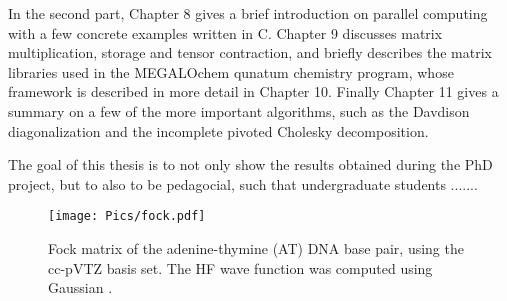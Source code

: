 In the second part, Chapter 8 gives a brief introduction on parallel computing with a few concrete examples written in C. Chapter 9 discusses matrix multiplication, storage and tensor contraction, and briefly describes the matrix libraries used in the MEGALOchem qunatum chemistry program, whose framework is described in more detail in Chapter 10. Finally Chapter 11 gives a summary on a few of the more important algorithms, such as the Davdison diagonalization and the incomplete pivoted Cholesky decomposition.    

The goal of this thesis is to not only show the results obtained during the PhD project, but to also to be pedagocial, such that undergraduate students .......

\begin{figure}
\centering
\texttt{[image: Pics/fock.pdf]}
\caption{Fock matrix of the adenine-thymine (AT) DNA base pair, using the cc-pVTZ basis set. The HF wave function was computed using Gaussian \cite{}.}
\label{SparseExample}
\end{figure}